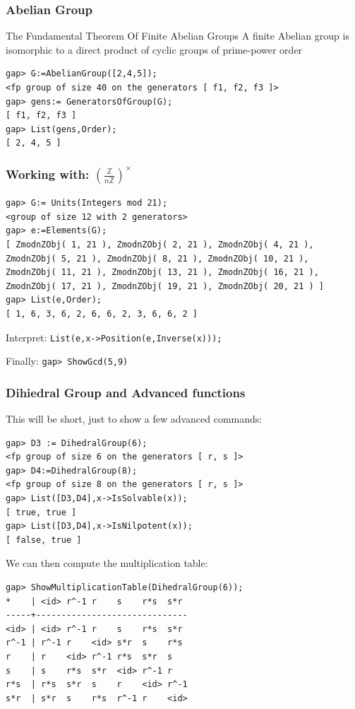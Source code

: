 \documentclass{beamer}
\theoremstyle{definition}
\theoremstyle{remark}
\begin{document}
\begin{frame}[fragile]
	\frametitle{Abelian Group}
	\begin{alertblock}{The Fundamental Theorem Of Finite Abelian Groups}
		A finite Abelian group is isomorphic to a direct product of cyclic groups of prime-power order
	\end{alertblock}
\begin{verbatim}
gap> G:=AbelianGroup([2,4,5]);
<fp group of size 40 on the generators [ f1, f2, f3 ]>
gap> gens:= GeneratorsOfGroup(G);
[ f1, f2, f3 ]
gap> List(gens,Order);
[ 2, 4, 5 ]
\end{verbatim}
\end{frame}

\begin{frame}[fragile]
\frametitle{Working with: $ \left( \frac{\mathbb{Z}}{n\mathbb{Z}} \right)^{\times} $}
\begin{verbatim}
gap> G:= Units(Integers mod 21);
<group of size 12 with 2 generators>
gap> e:=Elements(G);
[ ZmodnZObj( 1, 21 ), ZmodnZObj( 2, 21 ), ZmodnZObj( 4, 21 ),
ZmodnZObj( 5, 21 ), ZmodnZObj( 8, 21 ), ZmodnZObj( 10, 21 ),
ZmodnZObj( 11, 21 ), ZmodnZObj( 13, 21 ), ZmodnZObj( 16, 21 ),
ZmodnZObj( 17, 21 ), ZmodnZObj( 19, 21 ), ZmodnZObj( 20, 21 ) ]
gap> List(e,Order);
[ 1, 6, 3, 6, 2, 6, 6, 2, 3, 6, 6, 2 ]
\end{verbatim}
\pause
\begin{alertblock}{Interpret:}
	\texttt{List(e,x->Position(e,Inverse(x)));}
\end{alertblock}

Finally: \texttt{gap> ShowGcd(5,9)}

\end{frame}

\begin{frame}
\frametitle{Dihiedral Group and Advanced functions}
This will be short, just to show a few advanced commands:
\begin{verbatim}
gap> D3 := DihedralGroup(6);
<fp group of size 6 on the generators [ r, s ]>
gap> D4:=DihedralGroup(8);
<fp group of size 8 on the generators [ r, s ]>
gap> List([D3,D4],x->IsSolvable(x));
[ true, true ]
gap> List([D3,D4],x->IsNilpotent(x));
[ false, true ]
\end{verbatim}
We can then compute the multiplication table:
\begin{verbatim}
gap> ShowMultiplicationTable(DihedralGroup(6));
*    | <id> r^-1 r    s    r*s  s*r
-----+------------------------------
<id> | <id> r^-1 r    s    r*s  s*r
r^-1 | r^-1 r    <id> s*r  s    r*s
r    | r    <id> r^-1 r*s  s*r  s
s    | s    r*s  s*r  <id> r^-1 r
r*s  | r*s  s*r  s    r    <id> r^-1
s*r  | s*r  s    r*s  r^-1 r    <id>
\end{verbatim}
\end{frame}
\end{document}

